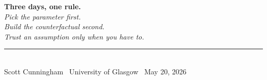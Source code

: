 \documentclass[aspectratio=169,11pt]{beamer}
\begin{document}
\begin{frame}[plain]
\centering
\vspace{2.5em}
{\Huge\bfseries\color{forest} Three days, one rule.}\\[1.5em]
{\Large\itshape\color{charcoal} Pick the parameter first.\\Build the counterfactual second.\\Trust an assumption only when you have to.}\\[2em]
\rule{0.4\textwidth}{0.6pt}\\[0.8em]
{\small\color{warmgray} Scott Cunningham \textperiodcentered\ University of Glasgow \textperiodcentered\ May 20, 2026}
\end{frame}
\end{document}
